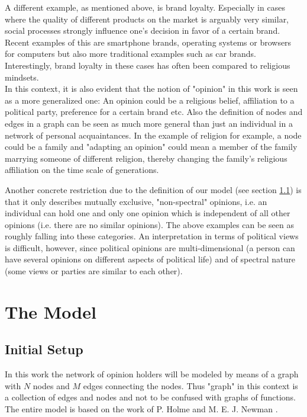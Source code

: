 \documentclass[11pt]{article}
\begin{document}
A different example, as mentioned above, is brand loyalty. Especially in cases where the quality of different products on the market is arguably very similar, social processes strongly influence one's decision in favor of a certain brand. Recent examples of this are smartphone brands, operating systems or browsers for computers but also more traditional examples such as car brands. Interestingly, brand loyalty in these cases has often been compared to religious mindsets. \\


In this context, it is also evident that the notion of "opinion" in this work is seen as a more generalized one: An opinion could be a religious belief, affiliation to a political party, preference for a certain brand etc. Also the definition of nodes and edges in a graph can be seen as much more general than just an individual in a network of personal acquaintances. In the example of religion for example, a node could be a family and "adapting an opinion" could mean a member of the family marrying someone of different religion, thereby changing the family's religious affiliation on the time scale of generations.

Another concrete restriction due to the definition of our model (see section \ref{sec:initial}) is that it only describes mutually exclusive, "non-spectral" opinions, i.e. an individual can hold one and only one opinion which is independent of all other opinions (i.e. there are no similar opinions). The above examples can be seen as roughly falling into these categories. An interpretation in terms of political views is difficult, however, since political opinions are multi-dimensional (a person can have several opinions on different aspects of political life) and of spectral nature (some views or parties are similar to each other). \\


\section{The Model}
\label{Sec:Model}

\subsection{Initial Setup}
\label{sec:initial}

In this work the network of opinion holders will be modeled by means of a graph with $N$ nodes and $M$ edges connecting the nodes. Thus "graph" in this context is a collection of edges and nodes and not to be confused with graphs of functions. The entire model is based on the work of P. Holme and M. E. J. Newman \cite{main paper}.\\
\end{document}
